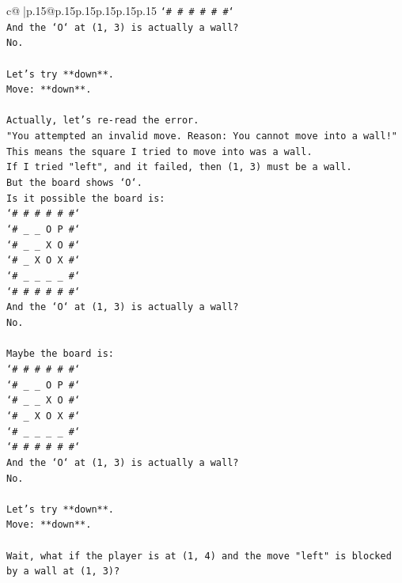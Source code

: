 \documentclass{article}
\begin{document}
{\begin{supertabular}{c@{$\;$}|p{.15\linewidth}@{}p{.15\linewidth}p{.15\linewidth}p{.15\linewidth}p{.15\linewidth}p{.15\linewidth}}
{{{\texttt{`\# \# \# \# \# \#`} \\
\texttt{And the `O` at (1, 3) is actually a wall?} \\
\texttt{No.} \\
\\ 
\texttt{Let's try **down**.} \\
\texttt{Move: **down**.} \\
\\ 
\texttt{Actually, let's re{-}read the error.} \\
\texttt{"You attempted an invalid move. Reason: You cannot move into a wall!"} \\
\texttt{This means the square I tried to move into was a wall.} \\
\texttt{If I tried "left", and it failed, then (1, 3) must be a wall.} \\
\texttt{But the board shows `O`.} \\
\texttt{Is it possible the board is:} \\
\texttt{`\# \# \# \# \# \#`} \\
\texttt{`\# \_ \_ O P \#`} \\
\texttt{`\# \_ \_ X O \#`} \\
\texttt{`\# \_ X O X \#`} \\
\texttt{`\# \_ \_ \_ \_ \#`} \\
\texttt{`\# \# \# \# \# \#`} \\
\texttt{And the `O` at (1, 3) is actually a wall?} \\
\texttt{No.} \\
\\ 
\texttt{Maybe the board is:} \\
\texttt{`\# \# \# \# \# \#`} \\
\texttt{`\# \_ \_ O P \#`} \\
\texttt{`\# \_ \_ X O \#`} \\
\texttt{`\# \_ X O X \#`} \\
\texttt{`\# \_ \_ \_ \_ \#`} \\
\texttt{`\# \# \# \# \# \#`} \\
\texttt{And the `O` at (1, 3) is actually a wall?} \\
\texttt{No.} \\
\\ 
\texttt{Let's try **down**.} \\
\texttt{Move: **down**.} \\
\\ 
\texttt{Wait, what if the player is at (1, 4) and the move "left" is blocked by a wall at (1, 3)?} \\
}}}
\end{supertabular}}
\end{document}
